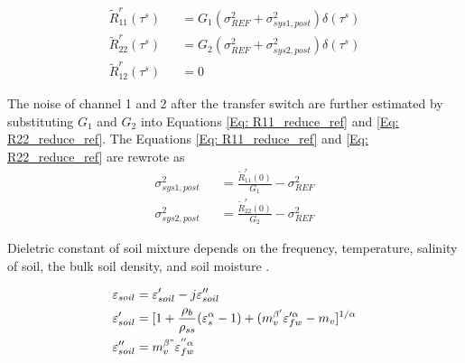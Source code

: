 \documentclass[draftcls,onecolumn]{IEEEtran}  %
\begin{document}
\begin{eqnarray}
	\tilde{R}_{11}^r(\tau^s) &&= G_1(\sigma^2_{REF}+\sigma^2_{sys1,post}) \delta(\tau^s)                                      
\label{Eq: R11_reduce_ref} \\
	\tilde{R}_{22}^r(\tau^s) &&= G_2(\sigma^2_{REF}+\sigma^2_{sys2,post}) \delta(\tau^s)                                
\label{Eq: R22_reduce_ref} \\
	\tilde{R}_{12}^r(\tau^s) &&= 0 
\label{Eq: R12_reduce_ref}
\end{eqnarray}

The noise of channel 1 and 2 after the transfer switch are further estimated by substituting $G_1$ and $G_2$ into Equations \ref{Eq: R11_reduce_ref} and \ref{Eq: R22_reduce_ref}. The Equations \ref{Eq: R11_reduce_ref} and \ref{Eq: R22_reduce_ref} are rewrote as
\begin{eqnarray}
	\sigma^2_{sys1,post} &&= \frac{\tilde{R}^r_{11}(0) }{G_1}-\sigma^2_{REF}  \label{Eq: Cal_channel_noise1} \\
    \sigma^2_{sys2,post} &&= \frac{\tilde{R}^r_{22}(0) }{G_2}-\sigma^2_{REF}  \label{Eq: Cal_channel_noise2} 
\end{eqnarray}




Dieletric constant of soil mixture depends on the frequency, temperature, salinity of soil, the bulk soil density, and soil moisture \cite{Peplinski:1995,Peplinski_correct:1995}.

\begin{equation} \label{eq: soil_dielectric_main}
\begin{split}
		 { \varepsilon_{soil} } &=  { \varepsilon'_{soil} } -j { \varepsilon''_{soil} } \\
    	 { \varepsilon'_{soil} } &= [1 + \frac{\rho_b}{\rho_{ss}} ( {\varepsilon_{s}^{\alpha}}-1) + (m_v^{\beta'}\varepsilon_{fw}^{\prime\alpha}-m_v]^{1/\alpha} \\
         { \varepsilon''_{soil} } &=m_v^{\beta"}\varepsilon_{fw}^{''\alpha}
\end{split}
\end{equation}
\end{document}

